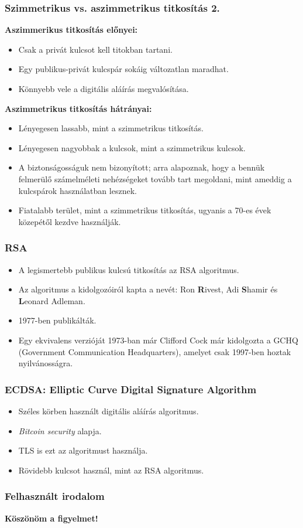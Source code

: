 \documentclass{beamer}
\begin{document}
\begin{frame}
    \frametitle{Szimmetrikus vs. aszimmetrikus titkosítás 2.}

    \textbf{Aszimmerikus titkosítás előnyei:}
    \begin{itemize}
        \item Csak a privát kulcsot kell titokban tartani.
        \item Egy publikus-privát kulcspár sokáig változatlan maradhat.
        \item Könnyebb vele a digitális aláírás megvalósítása.
    \end{itemize}

    \textbf{Aszimmetrikus titkosítás hátrányai:}
    \begin{itemize}
        \item Lényegesen lassabb, mint a szimmetrikus titkosítás.
        \item Lényegesen nagyobbak a kulcsok, mint a szimmetrikus kulcsok.
        \item A biztonságosságuk nem bizonyított; arra alapoznak, hogy a bennük felmerülő számelméleti nehézségeket tovább
              tart megoldani, mint ameddig a kulcspárok használatban lesznek.
        \item Fiatalabb terület, mint a szimmetrikus titkosítás, ugyanis a 70-es évek közepétől kezdve használják.
    \end{itemize}
\end{frame}

\begin{frame}
    \frametitle{RSA}

    \begin{itemize}
        \item A legismertebb publikus kulcsú titkosítás az RSA algoritmus.
        \item Az algoritmus a kidolgozóiról kapta a nevét: Ron \textbf{R}ivest, Adi \textbf{S}hamir és \textbf{L}eonard Adleman.
        \item 1977-ben publikálták.
        \item Egy ekvivalens verzióját 1973-ban már Clifford Cock már kidolgozta a GCHQ (Government Communication Headquarters),
              amelyet csak 1997-ben hoztak nyilvánosságra.
    \end{itemize}
\end{frame}

\begin{frame}
    \frametitle{ECDSA: Elliptic Curve Digital Signature Algorithm \cite{ecdsa}}

    \begin{itemize}
        \item Széles körben használt digitális aláírás algoritmus.
        \item \textit{Bitcoin security} alapja.
        \item TLS is ezt az algoritmust használja.
        \item Rövidebb kulcsot használ, mint az RSA algoritmus.
    \end{itemize}
\end{frame}

\begin{frame}
    \frametitle{Felhasznált irodalom}

    \printbibliography[heading=bibintoc]
\end{frame}

\begin{frame}
    \Huge
    \textbf{Köszönöm a figyelmet!}
\end{frame}
\end{document}
